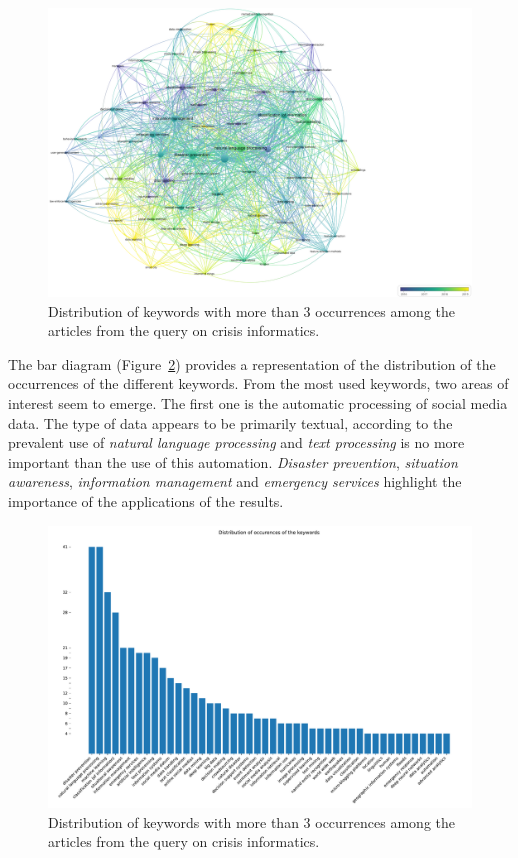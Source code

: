 \begin{landscape}
    \begin{figure}[hp]
        \includegraphics[width=\paperwidth,height=\paperheight,keepaspectratio]{figures/chap-2/crisis-informatic-overlay.pdf}
        \caption{Distribution of keywords with more than 3 occurrences among the articles from the query on crisis informatics. }
        \label{literature:crisis-informatic-overlay}
    \end{figure}
\end{landscape}

The bar diagram (Figure~\ref{literature:crisis-informatic-bar}) provides a representation of the distribution of the occurrences of the different keywords.
From the most used keywords, two areas of interest seem to emerge.
The first one is the automatic processing of social media data.
The type of data appears to be primarily textual, according to the prevalent use of \emph{natural language processing} and \emph{text processing} is no more important than the use of this automation.
\emph{Disaster prevention}, \emph{situation awareness}, \emph{information management} and \emph{emergency services} highlight the importance of the applications of the results.

\begin{figure}[thb]
    \includegraphics[width=\textwidth]{figures/chap-2/crisis-informatic-bar.pdf}
    \caption{Distribution of keywords with more than 3 occurrences among the articles from the query on crisis informatics. }
    \label{literature:crisis-informatic-bar}
\end{figure}

